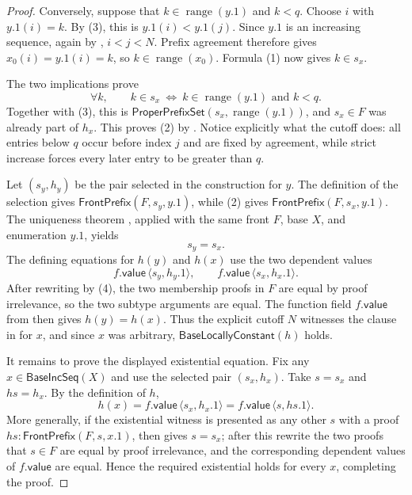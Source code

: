 \begin{proof}
Conversely, suppose that
\(k\in\operatorname{range}(y.1)\) and $k<q$.  Choose $i$ with
$y.1(i)=k$.  By (3), this is $y.1(i)<y.1(j)$.  Since $y.1$ is an
increasing sequence, again by , $i<j<N$.  Prefix agreement
therefore gives $x_0(i)=y.1(i)=k$, so
$k\in\operatorname{range}(x_0)$.  Formula (1) now gives $k\in s_x$.

The two implications prove
\[
  \forall k,\qquad k\in s_x\ \Longleftrightarrow\ k\in\operatorname{range}(y.1)
  \text{ and } k<q.
\]
Together with (3), this is
\(\mathsf{ProperPrefixSet}(s_x,\operatorname{range}(y.1))\), and
$s_x\in F$ was already part of $h_x$.  This proves (2) by
.  Notice explicitly what the cutoff does: all entries
below $q$ occur before index $j$ and are fixed by agreement, while strict
increase forces every later entry to be greater than $q$.

Let $(s_y,h_y)$ be the pair selected in the construction for $y$.  The
definition of the selection gives
\(\mathsf{FrontPrefix}(F,s_y,y.1)\), while (2) gives
\(\mathsf{FrontPrefix}(F,s_x,y.1)\).  The uniqueness theorem
, applied with the same front $F$, base $X$, and
enumeration $y.1$, yields
\[
  s_y=s_x.                                                  \tag{4}
\]
The defining equations for $h(y)$ and $h(x)$ use the two dependent values
\[
  f.\mathsf{value}\,\langle s_y,h_y.1\rangle,
  \qquad
  f.\mathsf{value}\,\langle s_x,h_x.1\rangle.
\]
After rewriting by (4), the two membership proofs in $F$ are equal by
proof irrelevance, so the two subtype arguments are equal.  The function
field $f.\mathsf{value}$ from  then gives
\(h(y)=h(x)\).  Thus the explicit cutoff $N$ witnesses the clause in
 for $x$, and since $x$ was arbitrary,
$\mathsf{BaseLocallyConstant}(h)$ holds.

It remains to prove the displayed existential equation.  Fix any
$x\in\mathsf{BaseIncSeq}(X)$ and use the selected pair $(s_x,h_x)$.
Take $s=s_x$ and $hs=h_x$.  By the definition of $h$,
\[
  h(x)=f.\mathsf{value}\,\langle s_x,h_x.1\rangle
       =f.\mathsf{value}\,\langle s,hs.1\rangle.
\]
More generally, if the existential witness is presented as any other
$s$ with a proof $hs:\mathsf{FrontPrefix}(F,s,x.1)$, then
 gives $s=s_x$; after this rewrite the two proofs
that $s\in F$ are equal by proof irrelevance, and the corresponding
dependent values of $f.\mathsf{value}$ are equal.  Hence the required
existential holds for every $x$, completing the proof.
\end{proof}
